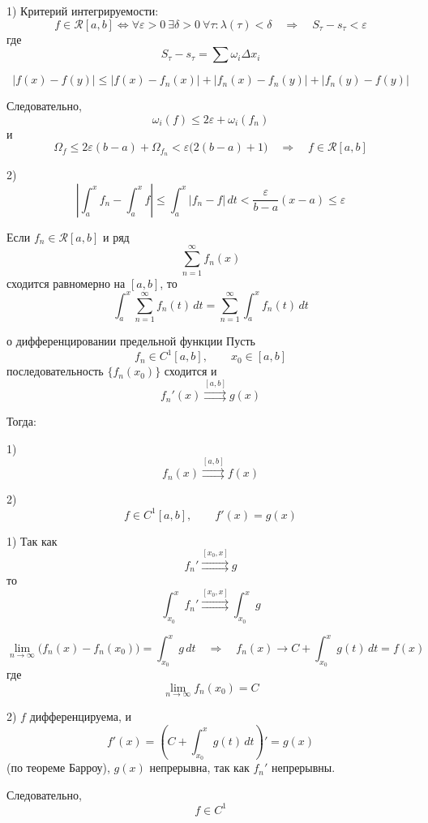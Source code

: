 \documentclass[12pt,a4paper]{article}
\begin{document}
\begin{proofbox}{}
    1) Критерий интегрируемости:
    \[
        f\in\mathcal{R}[a,b]
        \Longleftrightarrow
        \forall\varepsilon>0\ \exists\delta>0\ \forall\tau:
        \lambda(\tau)<\delta
        \quad\Longrightarrow\quad
        S_\tau-s_\tau<\varepsilon
    \]
    где
    \[
        S_\tau-s_\tau=\sum \omega_i\Delta x_i
    \]

    \[
        |f(x)-f(y)|
        \leq
        |f(x)-f_n(x)|
        +
        |f_n(x)-f_n(y)|
        +
        |f_n(y)-f(y)|
    \]

    Следовательно,
    \[
        \omega_i(f)\leq 2\varepsilon+\omega_i(f_n)
    \]
    и
    \[
        \Omega_f
        \leq
        2\varepsilon(b-a)+\Omega_{f_n}
        <
        \varepsilon\bigl(2(b-a)+1\bigr)
        \quad\Longrightarrow\quad
        f\in\mathcal{R}[a,b]
    \]

    2)
    \[
        \left|
        \int_a^x f_n-\int_a^x f
        \right|
        \leq
        \int_a^x|f_n-f|\,dt
        <
        \frac{\varepsilon}{b-a}(x-a)
        \leq\varepsilon
    \]
\end{proofbox}

\begin{corollary}
    Если $f_n\in\mathcal{R}[a,b]$ и ряд
    \[
        \sum_{n=1}^{\infty}f_n(x)
    \]
    сходится равномерно на $[a,b]$, то
    \[
        \int_a^x\sum_{n=1}^{\infty}f_n(t)\,dt
        =
        \sum_{n=1}^{\infty}\int_a^x f_n(t)\,dt
    \]
\end{corollary}

\begin{theorem}{о дифференцировании предельной функции}
    Пусть
    \[
        f_n\in C^1[a,b],\qquad x_0\in[a,b]
    \]
    последовательность $\{f_n(x_0)\}$ сходится и
    \[
        f_n'(x)\overset{[a,b]}{\rightrightarrows}g(x)
    \]

    Тогда:

    1)
    \[
        f_n(x)\overset{[a,b]}{\rightrightarrows}f(x)
    \]

    2)
    \[
        f\in C^1[a,b],
        \qquad
        f'(x)=g(x)
    \]
\end{theorem}

\begin{proofbox}{}
    1) Так как
    \[
        f_n' \overset{[x_0,x]}{\rightrightarrows} g
    \]
    то
    \[
        \int_{x_0}^{x} f_n' \overset{[x_0,x]}{\rightrightarrows} \int_{x_0}^{x} g
    \]

    \[
        \lim_{n\to\infty}\bigl(f_n(x)-f_n(x_0)\bigr)
        =
        \int_{x_0}^{x} g\,dt
        \quad\Longrightarrow\quad
        f_n(x)\longrightarrow C+\int_{x_0}^{x}g(t)\,dt=f(x)
    \]
    где
    \[
        \lim_{n\to\infty}f_n(x_0)=C
    \]

    2) $f$ дифференцируема, и
    \[
        f'(x)
        =
        \left(C+\int_{x_0}^{x}g(t)\,dt\right)'
        =
        g(x)
    \]
    (по теореме Барроу), $g(x)$ непрерывна, так как $f_n'$ непрерывны.

    Следовательно,
    \[
        f\in C^1
    \]
\end{proofbox}
\end{document}
